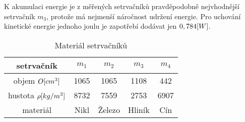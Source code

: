 \documentclass{article}
\begin{document}
K akumulaci energie je z měřených setrvačníků pravděpodobně nejvhodnější setrvačník \(m_3\), protože má nejmenší náročnost udržení energie. 
Pro uchování kinetické energie jednoho joulu je zapotřebí dodávat jen \(0,784\-[W]\).
\begin{table}[H]
  \centering
  \begin{tabular}{|c|c|c|c|c|}
    \hline
    setrvačník	                & \(m_1\)	& \(m_2\)   & \(m_3\) & \(m_4\) \\ \hline
    objem \(O\-[cm^3]\)         & 1065    & 1065      & 1108    & 442     \\ \hline
    hustota \(\rho\-[kg/m^3]\)  & 8732    & 7559      & 2753    & 6907    \\ \hline
    materiál                    & Nikl    & Železo    & Hliník  & Cín     \\ \hline
  \end{tabular}
  \caption{\label{tabulka_mereni} Materiál setrvačníků}
\end{table}
\end{document}
